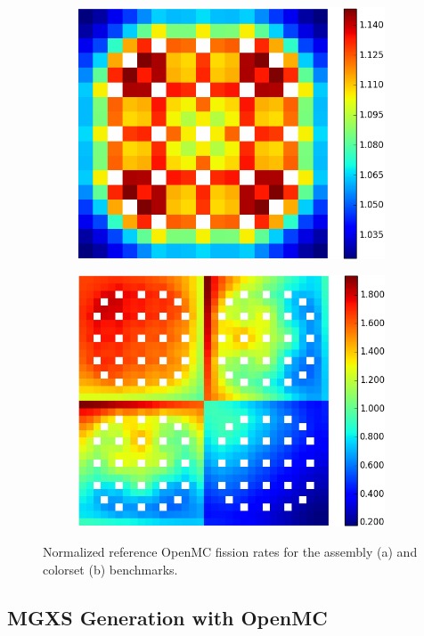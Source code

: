\begin{figure}[h!]
\centering
\begin{subfigure}{0.45\textwidth}
  \centering
  \includegraphics[width=0.8\linewidth]{figures/assembly/fission-rates}
  \caption{}
  \label{fig:fiss-assm}
\end{subfigure}%
\begin{subfigure}{0.45\textwidth}
  \centering
  \includegraphics[width=0.8\linewidth]{figures/colorset/fission-rates}
  \caption{}
  \label{fig:capt-assm}
\end{subfigure}
\caption{Normalized reference OpenMC fission rates for the assembly (a) and colorset (b) benchmarks.}
\label{fig:benchmarks-fiss-rates}
\end{figure}


\subsection{MGXS Generation with OpenMC}
\label{subsec:openmc}

